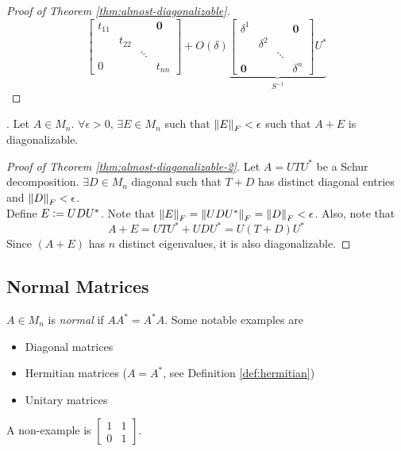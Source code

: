 \begin{proof}[Proof of Theorem \ref{thm:almost-diagonalizable}]
$${\begin{bmatrix}
t_{11} & & & \mathbf{0} \\
& t_{22} & & \\
& & \ddots & \\
0 & & & t_{nn} \end{bmatrix} + O(\delta)} \underbrace{\begin{bmatrix} \delta^1 & & & \mathbf{0} \\ & \delta^2 & & \\ & & \ddots & \\ \mathbf{0} & & & \delta^n \end{bmatrix} U^*}_{S^{-1}}
$$
\end{proof}

\begin{theorem}.
\label{thm:almost-diagonalizable-2}
Let $A \in M_n$. $\forall \epsilon > 0$, $\exists E \in M_n$ such that $\left\lVert E\right\rVert_F < \epsilon$ such that $A + E$ is diagonalizable.
\end{theorem}

\begin{proof}[Proof of Theorem \ref{thm:almost-diagonalizable-2}]
Let $A = UTU^*$ be a Schur decomposition. $\exists D \in M_n$ diagonal such that $T + D$ has distinct diagonal entries and $\left\lVert D\right\rVert_F < \epsilon$.\\

\noindent Define $E \vcentcolon= UDU^*$. Note that $\left\lVert E\right\rVert_F = \left\lVert UDU^*\right\rVert_F = \left\lVert D\right\rVert_F < \epsilon$. Also, note that
$$
A + E = UTU^* + UDU^* = U(T+D)U^*
$$
Since $(A+E)$ has $n$ distinct eigenvalues, it is also diagonalizable.
\end{proof}

\subsection{Normal Matrices}
\begin{definition}
\label{def:normal-matrices}
$A \in M_n$ is \textit{normal} if $AA^* = A^*A$. Some notable examples are
\begin{itemize}
    \item Diagonal matrices
    \item Hermitian matrices ($A = A^*$, see Definition \ref{def:hermitian})
    \item Unitary matrices
\end{itemize}
A non-example is $\begin{bmatrix}1 & 1 \\ 0 & 1\end{bmatrix}$.
\end{definition}

